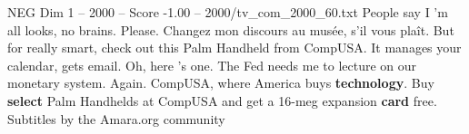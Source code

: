 \begin{textsample}{NEG Dim 1 – 2000 – Score -1.00 – 2000/tv\_com\_2000\_60.txt}  \label{ex:f1_neg_025}
People say I 'm all looks, no brains.
Please.
Changez mon discours au musée, s'il vous plaît.
But for really smart, check out this Palm Handheld from CompUSA.
It manages your calendar, gets email.
Oh, here 's one.
The Fed needs me to lecture on our monetary system.
Again.
CompUSA, where America buys \textbf{technology}.
Buy \textbf{select} Palm Handhelds at CompUSA and get a 16-meg expansion \textbf{card} free.
Subtitles by the Amara.org community

\end{textsample}
